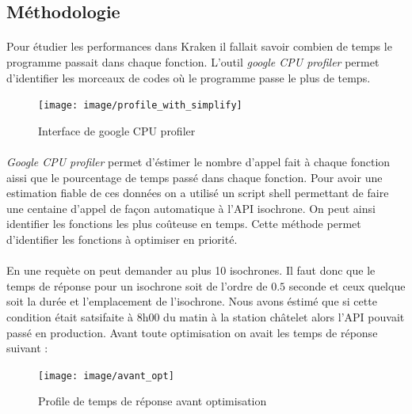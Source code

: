 \documentclass[a4paper]{report}
\begin{document}
\subsection{Méthodologie}

\paragraph{} Pour étudier les performances dans Kraken il fallait savoir combien de temps le programme passait dans chaque fonction. L'outil \emph{google CPU profiler} permet d'identifier les morceaux de codes où le programme passe le plus de temps. 

\begin{figure}[H]
	\begin{center}
		\texttt{[image: image/profile\_with\_simplify]}
		\caption{Interface de google CPU profiler}
		\label{Interface de google CPU profiler}
	\end{center}
\end{figure}

\paragraph{} \emph{Google CPU profiler} permet d'éstimer le nombre d'appel fait à chaque fonction aissi que le pourcentage de temps passé dans chaque fonction. Pour avoir une estimation fiable de ces données on a utilisé un script shell permettant de faire une centaine d'appel de façon automatique à l'API isochrone. On peut ainsi identifier les fonctions les plus coûteuse en temps. Cette méthode permet d'identifier les fonctions à optimiser en priorité. 

\paragraph{} En une requète on peut demander au plus 10 isochrones. Il faut donc que le temps de réponse pour un isochrone soit de l'ordre de $0.5$ seconde et ceux quelque soit la durée et l'emplacement de l'isochrone. Nous avons éstimé que si cette condition était satsifaite à 8h00 du matin à la station châtelet alors l'API pouvait passé en production. Avant toute optimisation on avait les temps de réponse suivant :

\begin{figure}[H]
	\begin{center}
		\texttt{[image: image/avant\_opt]}
		\caption{Profile de temps de réponse avant optimisation}
		\label{Profile de temps de réponse avant optimisation}
	\end{center}
\end{figure}
\end{document}

